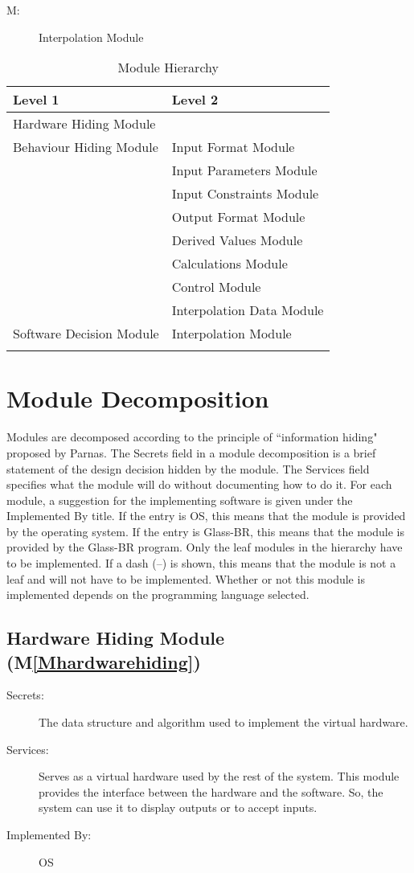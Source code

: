 \documentclass[12pt]{article}
\newcounter{modnum}
\newcommand{\mthemodnum}{M\themodnum}
\begin{document}
\begin{description}
\item[\mthemodnum\label{Minterpolation}:]Interpolation Module
\end{description}
\begin{longtable}{l l}
\toprule
Level 1 & Level 2
\\
\midrule
Hardware Hiding Module & 
\\
Behaviour Hiding Module & Input Format Module
\\
 & Input Parameters Module
\\
 & Input Constraints Module
\\
 & Output Format Module
\\
 & Derived Values Module
\\
 & Calculations Module
\\
 & Control Module
\\
 & Interpolation Data Module
\\
Software Decision Module & Interpolation Module
\\
\bottomrule
\caption{Module Hierarchy}
\label{Table:MH}
\end{longtable}
\section{Module Decomposition}
\label{Sec:MD}
Modules are decomposed according to the principle of ``information hiding" proposed by Parnas. The Secrets field in a module decomposition is a brief statement of the design decision hidden by the module. The Services field specifies what the module will do without documenting how to do it. For each module, a suggestion for the implementing software is given under the Implemented By title. If the entry is OS, this means that the module is provided by the operating system. If the entry is Glass-BR, this means that the module is provided by the Glass-BR program. Only the leaf modules in the hierarchy have to be implemented. If a dash (--) is shown, this means that the module is not a leaf and will not have to be implemented. Whether or not this module is implemented depends on the programming language selected.
\subsection{Hardware Hiding Module (M\ref{Mhardwarehiding})}
\label{Sec:HHM()}
\begin{description}
\item[Secrets:]The data structure and algorithm used to implement the virtual hardware.
\item[Services:]Serves as a virtual hardware used by the rest of the system. This module provides the interface between the hardware and the software. So, the system can use it to display outputs or to accept inputs.
\item[Implemented By:]OS
\end{description}
\end{document}

